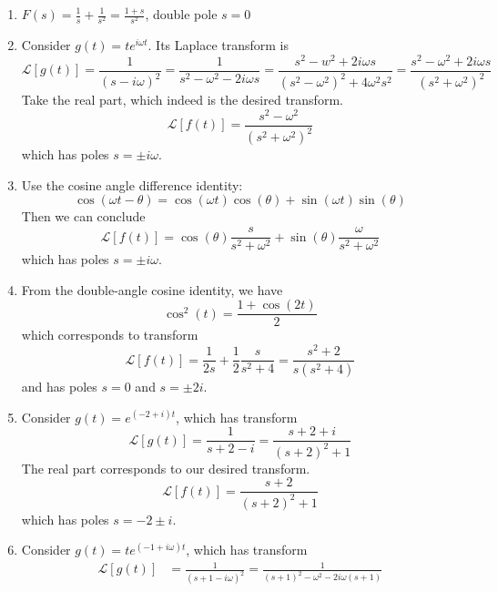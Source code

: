\documentclass[a4paper]{article}
\begin{document}
\begin{enumerate}[label=(\alph*)]
	\item \( \displaystyle{F \!\left( s \right) = \frac{1}{s} + \frac{1}{s^{2}}} = \frac{1 + s}{s^{2}} \), double pole \( s = 0 \)
	\item Consider \( g \!\left( t \right) = te^{i \omega t} \). Its Laplace transform is
	\[
		\mathcal{L}\!\left[ g \!\left( t \right) \right] = \frac{1}{\!\left( s - i \omega \right)^{2}} = \frac{1}{s^{2} - \omega^{2} - 2i \omega s} = \frac{s^{2} - w^{2} + 2i \omega s}{\!\left( s^{2} - \omega^{2} \right)^{2} + 4 \omega^{2}s^{2}} = \frac{s^{2} - \omega^{2} + 2i \omega s}{\!\left( s^{2} + \omega^{2} \right)^{2}}
	\]
	Take the real part, which indeed is the desired transform.
	\[
		\mathcal{L}\!\left[ f \!\left( t \right) \right] = \frac{s^{2} - \omega^{2}}{\!\left( s^{2} + \omega^{2} \right)^{2}} 
	\]
	which has poles \( s = \pm i \omega \).
	\item Use the cosine angle difference identity:
	\[
		\cos\!\left(\omega t - \theta\right) = \cos\!\left(\omega t\right) \cos\!\left(\theta\right) + \sin\!\left(\omega t\right) \sin\!\left(\theta\right)
	\]
	Then we can conclude
	\[
		\mathcal{L}\!\left[ f \!\left( t \right) \right] = \cos\!\left(\theta\right) \frac{s}{s^{2} + \omega^{2}} + \sin\!\left(\theta\right) \frac{\omega}{s^{2} + \omega^{2}} 
	\]
	which has poles \( s = \pm i \omega \).
	\item From the double-angle cosine identity, we have
	\[
		\cos^{2}\!\left(t\right) = \frac{1 + \cos\!\left(2t\right)}{2} 
	\]
	which corresponds to transform
	\[
		\mathcal{L}\!\left[ f \!\left( t \right) \right] = \frac{1}{2s} + \frac{1}{2}\frac{s}{s^{2} + 4} = \frac{s^{2} + 2}{s \!\left( s^{2} + 4 \right)}
	\]
	and has poles \( s = 0 \) and \( s = \pm 2i \).
	\item Consider \( g \!\left( t \right) = e^{\!\left( -2 + i \right)t} \), which has transform
	\[
		\mathcal{L}\!\left[ g \!\left( t \right) \right] = \frac{1}{s + 2 - i} = \frac{s + 2 + i}{\!\left( s + 2 \right)^{2} + 1} 
	\]
	The real part corresponds to our desired transform.
	\[
		\mathcal{L}\!\left[ f \!\left( t \right) \right] = \frac{s + 2}{\!\left( s + 2 \right)^{2} + 1}
	\]
	which has poles \( s = -2 \pm i \).
	\item Consider \( g \!\left( t \right) = te^{\!\left( -1 + i \omega \right)t} \), which has transform
	\begin{align*}
		\mathcal{L}\!\left[ g \!\left( t \right) \right] & = \frac{1}{\!\left( s + 1 - i \omega \right)^{2}} = \frac{1}{\!\left( s + 1 \right)^{2} - \omega^{2} - 2 i \omega \!\left( s + 1 \right)} \\

\end{align*}
\end{enumerate}
\end{document}
